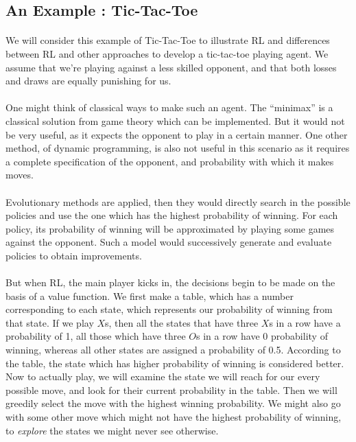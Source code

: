 \documentclass{article}
\begin{document}
  \subsection{An Example : Tic-Tac-Toe}
    \paragraph{}We will consider this example of Tic-Tac-Toe to illustrate RL and differences between RL and other approaches to develop a tic-tac-toe playing agent. We assume that we’re playing against a less skilled opponent, and that both losses and draws are equally punishing for us.
    \paragraph{}One might think of classical ways to make such an agent. The “minimax” is a classical solution from game theory which can be implemented. But it would not be very useful, as it expects the opponent to play in a certain manner. One other method, of dynamic programming, is also not useful in this scenario as it requires a complete specification of the opponent, and probability with which it makes moves.
    \paragraph{}Evolutionary methods are applied, then they would directly search in the possible policies and use the one which has the highest probability of winning. For each policy, its probability of winning will be approximated by playing some games against the opponent. Such a model would successively generate and evaluate policies to obtain improvements.
    \paragraph{}But when RL, the main player kicks in, the decisions begin to be made on the basis of a value function. We first make a table, which has a number corresponding to each state, which represents our probability of winning from that state. If we play $X$s, then all the states that have three $X$s in a row have a probability of 1, all those which have three $O$s in a row have 0 probability of winning, whereas all other states are assigned a probability of 0.5. According to the table, the state which has higher probability of winning is considered better. Now to actually play, we will examine the state we will reach for our every possible move, and look for their current probability in the table. Then we will greedily select the move with the highest winning probability. We might also go with some other move which might not have the highest probability of winning, to \textit{explore} the states we might never see otherwise.
\end{document}
